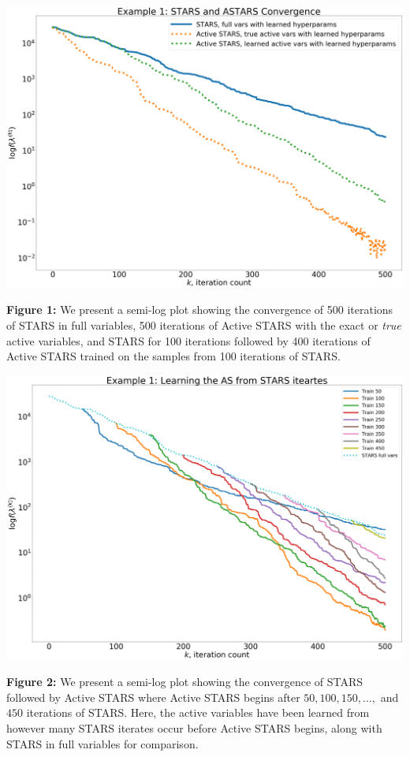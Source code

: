 \documentclass{amsart}
\begin{document}
\begin{center}


\includegraphics[scale=.14]{ex_1_pic_2} 

\textbf{Figure 1:} We present a semi-log plot showing the convergence of 500 iterations of STARS in full variables, 500 iterations of Active STARS with the exact or \textit{true} active variables, and STARS for 100 iterations followed by 400 iterations of Active STARS trained on the samples from 100 iterations of STARS.

\vspace{.5cm}

\includegraphics[scale=.14]{ex_1_pic_1}

\textbf{Figure 2:} We present a semi-log plot showing the convergence of STARS followed by Active STARS where Active STARS begins after $50,100,150,\ldots,$ and $450$ iterations of STARS. Here, the active variables have been learned from however many STARS iterates occur before Active STARS begins, along with STARS in full variables for comparison.

\end{center}
\end{document}
